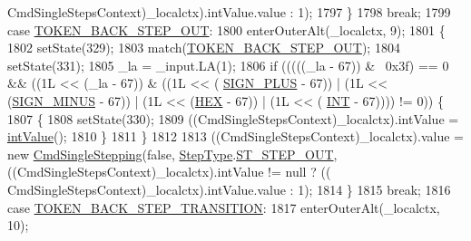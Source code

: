\begin{DoxyCode}
      CmdSingleStepsContext)\_localctx).intValue.value : 1); 
1797         \}
1798         \textcolor{keywordflow}{break};
1799       \textcolor{keywordflow}{case} \hyperlink{classgov_1_1nasa_1_1jpf_1_1inspector_1_1client_1_1parser_1_1_console_grammar_parser_a90de6a3a8324fd0c4e68c51e0a45ff59}{TOKEN\_BACK\_STEP\_OUT}:
1800         enterOuterAlt(\_localctx, 9);
1801         \{
1802         setState(329);
1803         match(\hyperlink{classgov_1_1nasa_1_1jpf_1_1inspector_1_1client_1_1parser_1_1_console_grammar_parser_a90de6a3a8324fd0c4e68c51e0a45ff59}{TOKEN\_BACK\_STEP\_OUT});
1804         setState(331);
1805         \_la = \_input.LA(1);
1806         \textcolor{keywordflow}{if} (((((\_la - 67)) & ~0x3f) == 0 && ((1L << (\_la - 67)) & ((1L << (
      \hyperlink{classgov_1_1nasa_1_1jpf_1_1inspector_1_1client_1_1parser_1_1_console_grammar_parser_ac2a6ae73b3b6ce7feef07c1b4866af05}{SIGN\_PLUS} - 67)) | (1L << (\hyperlink{classgov_1_1nasa_1_1jpf_1_1inspector_1_1client_1_1parser_1_1_console_grammar_parser_a48b3f6921fee5d663dafe240074dac66}{SIGN\_MINUS} - 67)) | (1L << (\hyperlink{classgov_1_1nasa_1_1jpf_1_1inspector_1_1client_1_1parser_1_1_console_grammar_parser_a760e1cd3b643e8ee8af5d134b5d438c6}{HEX} - 67)) | (1L << (
      \hyperlink{classgov_1_1nasa_1_1jpf_1_1inspector_1_1client_1_1parser_1_1_console_grammar_parser_abd77a1befc3eca91ef4ffb5856126df5}{INT} - 67)))) != 0)) \{
1807           \{
1808           setState(330);
1809           ((CmdSingleStepsContext)\_localctx).intValue = \hyperlink{classgov_1_1nasa_1_1jpf_1_1inspector_1_1client_1_1parser_1_1_console_grammar_parser_a132b5d5236398d90d8d1e6b16dc0bd20}{intValue}();
1810           \}
1811         \}
1812 
1813          ((CmdSingleStepsContext)\_localctx).value =  \textcolor{keyword}{new} \hyperlink{classgov_1_1nasa_1_1jpf_1_1inspector_1_1client_1_1commands_1_1_cmd_single_stepping}{CmdSingleStepping}(\textcolor{keyword}{false}, 
      \hyperlink{enumgov_1_1nasa_1_1jpf_1_1inspector_1_1interfaces_1_1_commands_interface_1_1_step_type}{StepType}.\hyperlink{enumgov_1_1nasa_1_1jpf_1_1inspector_1_1interfaces_1_1_commands_interface_1_1_step_type_aa1a566d7ef680bc49ccaa4f710384a7b}{ST\_STEP\_OUT},     ((CmdSingleStepsContext)\_localctx).intValue != null ? ((
      CmdSingleStepsContext)\_localctx).intValue.value : 1); 
1814         \}
1815         \textcolor{keywordflow}{break};
1816       \textcolor{keywordflow}{case} \hyperlink{classgov_1_1nasa_1_1jpf_1_1inspector_1_1client_1_1parser_1_1_console_grammar_parser_a92588b71397a4a48b5b75155f6246a75}{TOKEN\_BACK\_STEP\_TRANSITION}:
1817         enterOuterAlt(\_localctx, 10);

\end{DoxyCode}
